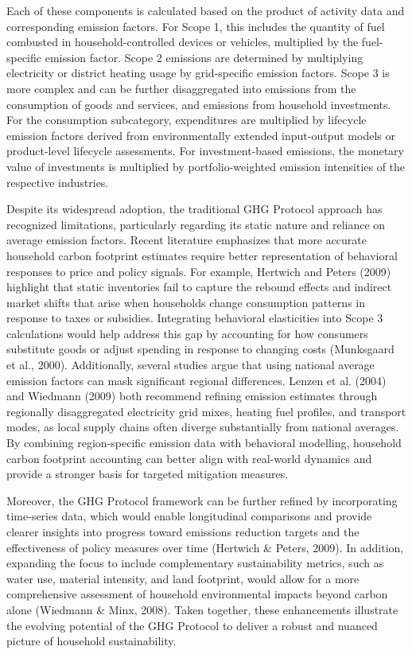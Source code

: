 \documentclass[12pt,a4paper]{article}%
\begin{document}
Each of these components is calculated based on the product of activity data and corresponding emission factors. For Scope 1, this includes the quantity of fuel combusted in household-controlled devices or vehicles, multiplied by the fuel-specific emission factor. Scope 2 emissions are determined by multiplying electricity or district heating usage by grid-specific emission factors. Scope 3 is more complex and can be further disaggregated into emissions from the consumption of goods and services, and emissions from household investments. For the consumption subcategory, expenditures are multiplied by lifecycle emission factors derived from environmentally extended input-output models or product-level lifecycle assessments. For investment-based emissions, the monetary value of investments is multiplied by portfolio-weighted emission intensities of the respective industries.

Despite its widespread adoption, the traditional GHG Protocol approach has recognized limitations, particularly regarding its static nature and reliance on average emission factors. Recent literature emphasizes that more accurate household carbon footprint estimates require better representation of behavioral responses to price and policy signals. For example, Hertwich and Peters (2009) highlight that static inventories fail to capture the rebound effects and indirect market shifts that arise when households change consumption patterns in response to taxes or subsidies. Integrating behavioral elasticities into Scope 3 calculations would help address this gap by accounting for how consumers substitute goods or adjust spending in response to changing costs (Munksgaard et al., 2000). Additionally, several studies argue that using national average emission factors can mask significant regional differences. Lenzen et al. (2004) and Wiedmann (2009) both recommend refining emission estimates through regionally disaggregated electricity grid mixes, heating fuel profiles, and transport modes, as local supply chains often diverge substantially from national averages. By combining region-specific emission data with behavioral modelling, household carbon footprint accounting can better align with real-world dynamics and provide a stronger basis for targeted mitigation measures.

Moreover, the GHG Protocol framework can be further refined by incorporating time-series data, which would enable longitudinal comparisons and provide clearer insights into progress toward emissions reduction targets and the effectiveness of policy measures over time (Hertwich \& Peters, 2009). In addition, expanding the focus to include complementary sustainability metrics, such as water use, material intensity, and land footprint, would allow for a more comprehensive assessment of household environmental impacts beyond carbon alone (Wiedmann \& Minx, 2008). Taken together, these enhancements illustrate the evolving potential of the GHG Protocol to deliver a robust and nuanced picture of household sustainability.
\end{document}
